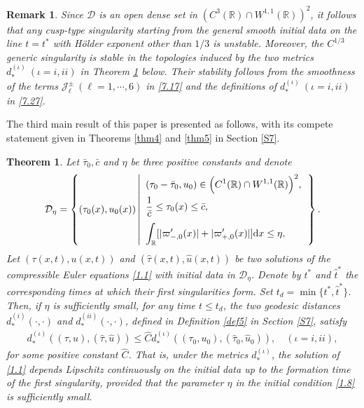 \documentclass[11pt,reqno]{article}
\newtheorem{thmABC}{Theorem}
\newtheorem{rem}{Remark}
\newcommand{\dps}{\displaystyle}
\newcommand{\fr}{\frac}
\numberwithin{equation}{section}
\begin{document}
\begin{rem}
Since $\mathcal{D}$ is an open dense set in $(C^3(\mathbb{R})\cap W^{1,1}(\mathbb{R}))^2$, it follows that any cusp-type singularity starting from the general smooth initial data on the line $t=t^*$ with H\"older exponent other than $1/3$ is unstable. Moreover, the $C^{1/3}$ generic singularity is stable
in the topologies induced by the two metrics $d_{*}^{(\iota)}\ (\iota=i,ii)$ in Theorem \ref{thmC} below. Their stability follows from the smoothness of the terms $\mathcal{J}_{\ell}^\pm\ (\ell=1,\cdots,6)$ in \eqref{7.17} and the definitions of $d_{*}^{(\iota)}\ (\iota=i,ii)$ in \eqref{7.27}.
\end{rem}

The third main result of this paper is presented as follows, with its compete statement given in Theorems \ref{thm4} and \ref{thm5} in Section \ref{S7}.
\begin{thmABC}\label{thmC}
Let $\bar{\tau}_0, \bar{c}$ and $\eta$ be three positive constants and denote
\begin{align}\label{1.8}
\mathcal{D}_{\eta}=\left\{(\tau_0(x), u_0(x))\left|
\begin{array}{ll}
\dps (\tau_0-\bar{\tau}_0, u_0)\in \Big(C^1(\mathbb{R})\cap W^{1,1}(\mathbb{R})\Big)^2,\\[6pt]
\dps \fr{1}{\bar{c}}\leq \tau_0(x)\leq \bar{c},\\[10pt]
\dps \int_{\mathbb{R}}[|\varpi_{-,0}'(x)|+|\varpi_{+,0}'(x)|] {\rm d}x\leq \eta,
\end{array}
\right.
\right\}.
\end{align}
Let $(\tau(x,t), u(x,t))$ and $(\hat{\tau}(x,t), \hat{u}(x,t))$ be two solutions of the compressible Euler equations \eqref{1.1} with initial data in $\mathcal{D}_{\eta}$. Denote by $t^*$ and $\hat{t}^*$ the corresponding times at which their first singularities form. Set $t_d=\min\{t^*, \hat{t}^*\}$. Then, if $\eta$ is sufficiently small, for any time $t\leq t_d$, the two geodesic distances
$d_{*}^{(i)}(\cdot,\cdot)$ and $d_{*}^{(ii)}(\cdot,\cdot)$, defined in Definition \ref{def5} in Section \ref{S7}, satisfy
\begin{align}\label{1.9}
d_{*}^{(\iota)}((\tau, u),(\hat{\tau}, \hat{u}))\leq \widehat{C} d_{*}^{(\iota)}((\tau_0, u_{0}),(\hat{\tau}_0, \hat{u}_{0})),\quad (\iota=i,ii),
\end{align}
for some positive constant $\widehat{C}$. That is, under the metrics $d_{*}^{(\iota)}$,
the solution of \eqref{1.1} depends Lipschitz continuously on the initial data up to the formation time of the first singularity, provided that the parameter $\eta$ in the initial condition \eqref{1.8} is sufficiently small.
\end{thmABC}
\end{document}
